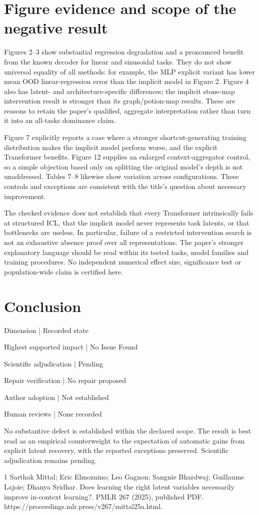 \documentclass[10pt]{article}
\begin{document}
\section*{Figure evidence and scope of the negative result}
Figures 2–3 show substantial regression degradation and a pronounced benefit from the known decoder for linear and sinusoidal tasks. They do not show universal equality of all methods: for example, the MLP explicit variant has lower mean OOD linear-regression error than the implicit model in Figure 2. Figure 4 also has latent- and architecture-specific differences; the implicit stone-map intervention result is stronger than its graph/potion-map results. These are reasons to retain the paper’s qualified, aggregate interpretation rather than turn it into an all-tasks dominance claim.\par
Figure 7 explicitly reports a case where a stronger shortcut-generating training distribution makes the implicit model perform worse, and the explicit Transformer benefits. Figure 12 supplies an enlarged context-aggregator control, so a simple objection based only on splitting the original model’s depth is not unaddressed. Tables 7–8 likewise show variation across configurations. These controls and exceptions are consistent with the title’s question about necessary improvement.\par
The checked evidence does not establish that every Transformer intrinsically fails at structured ICL, that the implicit model never represents task latents, or that bottlenecks are useless. In particular, failure of a restricted intervention search is not an exhaustive absence proof over all representations. The paper’s stronger explanatory language should be read within its tested tasks, model families and training procedures. No independent numerical effect size, significance test or population-wide claim is certified here.\par
\section*{Conclusion}
Dimension | Recorded state\par
Highest supported impact | No Issue Found\par
Scientific adjudication | Pending\par
Repair verification | No repair proposed\par
Author adoption | Not established\par
Human reviews | None recorded\par
No substantive defect is established within the declared scope. The result is best read as an empirical counterweight to the expectation of automatic gains from explicit latent recovery, with the reported exceptions preserved. Scientific adjudication remains pending.\par
1 Sarthak Mittal; Eric Elmoznino; Leo Gagnon; Sangnie Bhardwaj; Guillaume Lajoie; Dhanya Sridhar. Does learning the right latent variables necessarily improve in-context learning?. PMLR 267 (2025), published PDF. https://proceedings.mlr.press/v267/mittal25a.html.\par
\end{document}
